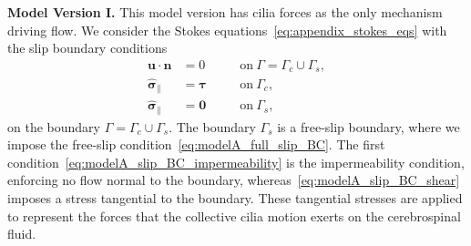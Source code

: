 \documentclass[fleqn]{wlscirep}
\newcommand{\Gs}{\Gamma_{s}}
\newcommand{\Gc}{\Gamma_{c}}
\newcommand{\nn}{\mathbf{n}}
\newcommand{\rr}{\mathbf{r}}
\newcommand{\uu}{\mathbf{u}}
\newcommand{\bsig}{\bm{\sigma}}
\newcommand{\bsigpar}{\hat{\bsig}_{\parallel}}
\newcommand{\btau}{\bm{\tau}}
\begin{document}
\textbf{Model Version I.} This model version has cilia forces as the only mechanism driving flow. We consider the Stokes equations~\eqref{eq:appendix_stokes_eqs} with the slip boundary conditions
\begin{subequations}
    \begin{alignat}{2}
        \uu\cdot\nn &= 0 \quad &&\mathrm{on} \ \Gamma=\Gc\cup\Gs, \label{eq:modelA_slip_BC_impermeability} \\
        \bsigpar &= \btau \quad &&\mathrm{on} \ \Gc,
        \label{eq:modelA_slip_BC_shear} \\
        \bsigpar &= \mathbf{0} \quad &&\mathrm{on} \ \Gs,\label{eq:modelA_full_slip_BC}
    \end{alignat}\label{eq:modelA_slip_BC}%
\end{subequations}%
on the boundary $\Gamma=\Gamma_c\cup\Gamma_s$. The boundary $\Gamma_s$ is a free-slip boundary, where we impose the free-slip condition~\eqref{eq:modelA_full_slip_BC}. The first condition~\eqref{eq:modelA_slip_BC_impermeability} is the impermeability condition, enforcing no flow normal to the boundary, whereas~\eqref{eq:modelA_slip_BC_shear} imposes a stress tangential to the boundary. These tangential stresses are applied to represent the forces that the collective cilia motion exerts on the cerebrospinal fluid. 
\end{document}
